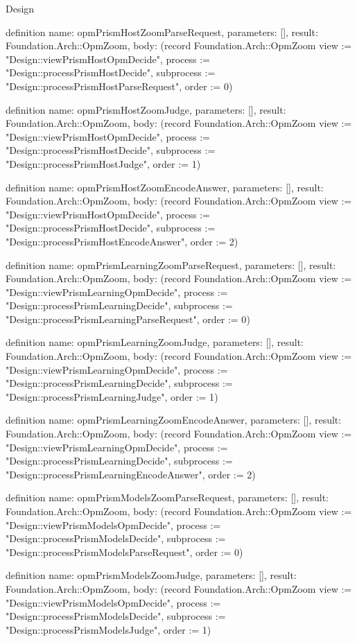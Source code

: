 \begin{lexlean}{Design}
\begin{semanticmodule}
definition{
  name: opmPrismHostZoomParseRequest,
  parameters: [],
  result: Foundation.Arch::OpmZoom,
  body: (record Foundation.Arch::OpmZoom {view := "Design::viewPrismHostOpmDecide", process := "Design::processPrismHostDecide", subprocess := "Design::processPrismHostParseRequest", order := 0})
}

definition{
  name: opmPrismHostZoomJudge,
  parameters: [],
  result: Foundation.Arch::OpmZoom,
  body: (record Foundation.Arch::OpmZoom {view := "Design::viewPrismHostOpmDecide", process := "Design::processPrismHostDecide", subprocess := "Design::processPrismHostJudge", order := 1})
}

definition{
  name: opmPrismHostZoomEncodeAnswer,
  parameters: [],
  result: Foundation.Arch::OpmZoom,
  body: (record Foundation.Arch::OpmZoom {view := "Design::viewPrismHostOpmDecide", process := "Design::processPrismHostDecide", subprocess := "Design::processPrismHostEncodeAnswer", order := 2})
}

definition{
  name: opmPrismLearningZoomParseRequest,
  parameters: [],
  result: Foundation.Arch::OpmZoom,
  body: (record Foundation.Arch::OpmZoom {view := "Design::viewPrismLearningOpmDecide", process := "Design::processPrismLearningDecide", subprocess := "Design::processPrismLearningParseRequest", order := 0})
}

definition{
  name: opmPrismLearningZoomJudge,
  parameters: [],
  result: Foundation.Arch::OpmZoom,
  body: (record Foundation.Arch::OpmZoom {view := "Design::viewPrismLearningOpmDecide", process := "Design::processPrismLearningDecide", subprocess := "Design::processPrismLearningJudge", order := 1})
}

definition{
  name: opmPrismLearningZoomEncodeAnswer,
  parameters: [],
  result: Foundation.Arch::OpmZoom,
  body: (record Foundation.Arch::OpmZoom {view := "Design::viewPrismLearningOpmDecide", process := "Design::processPrismLearningDecide", subprocess := "Design::processPrismLearningEncodeAnswer", order := 2})
}

definition{
  name: opmPrismModelsZoomParseRequest,
  parameters: [],
  result: Foundation.Arch::OpmZoom,
  body: (record Foundation.Arch::OpmZoom {view := "Design::viewPrismModelsOpmDecide", process := "Design::processPrismModelsDecide", subprocess := "Design::processPrismModelsParseRequest", order := 0})
}

definition{
  name: opmPrismModelsZoomJudge,
  parameters: [],
  result: Foundation.Arch::OpmZoom,
  body: (record Foundation.Arch::OpmZoom {view := "Design::viewPrismModelsOpmDecide", process := "Design::processPrismModelsDecide", subprocess := "Design::processPrismModelsJudge", order := 1})
}


\end{semanticmodule}
\end{lexlean}

